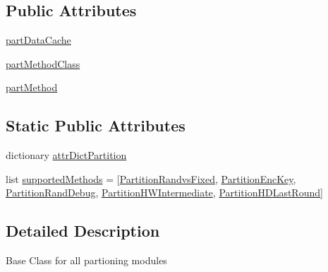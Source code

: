 \subsection*{Public Attributes}
\begin{DoxyCompactItemize}
\item 
\hyperlink{classsoftware_1_1chipwhisperer_1_1analyzer_1_1utils_1_1Partition_1_1Partition_aef13ee27c73d8d4f03dd66e4bac4a3e3}{part\+Data\+Cache}
\item 
\hyperlink{classsoftware_1_1chipwhisperer_1_1analyzer_1_1utils_1_1Partition_1_1Partition_a4feb4eb5ec25ed777dc4f2e9e8145180}{part\+Method\+Class}
\item 
\hyperlink{classsoftware_1_1chipwhisperer_1_1analyzer_1_1utils_1_1Partition_1_1Partition_a03126b5ccf709ba15cc8441e0b98f812}{part\+Method}
\end{DoxyCompactItemize}
\subsection*{Static Public Attributes}
\begin{DoxyCompactItemize}
\item 
dictionary \hyperlink{classsoftware_1_1chipwhisperer_1_1analyzer_1_1utils_1_1Partition_1_1Partition_a1f010e20f7d43c561882412dc91567fc}{attr\+Dict\+Partition}
\item 
list \hyperlink{classsoftware_1_1chipwhisperer_1_1analyzer_1_1utils_1_1Partition_1_1Partition_ae5d930fd343377de83dad6da6a82b514}{supported\+Methods} = \mbox{[}\hyperlink{classsoftware_1_1chipwhisperer_1_1analyzer_1_1utils_1_1Partition_1_1PartitionRandvsFixed}{Partition\+Randvs\+Fixed}, \hyperlink{classsoftware_1_1chipwhisperer_1_1analyzer_1_1utils_1_1Partition_1_1PartitionEncKey}{Partition\+Enc\+Key}, \hyperlink{classsoftware_1_1chipwhisperer_1_1analyzer_1_1utils_1_1Partition_1_1PartitionRandDebug}{Partition\+Rand\+Debug}, \hyperlink{classsoftware_1_1chipwhisperer_1_1analyzer_1_1utils_1_1Partition_1_1PartitionHWIntermediate}{Partition\+H\+W\+Intermediate}, \hyperlink{classsoftware_1_1chipwhisperer_1_1analyzer_1_1utils_1_1Partition_1_1PartitionHDLastRound}{Partition\+H\+D\+Last\+Round}\mbox{]}
\end{DoxyCompactItemize}


\subsection{Detailed Description}
\begin{DoxyVerb}Base Class for all partioning modules
\end{DoxyVerb}
 

